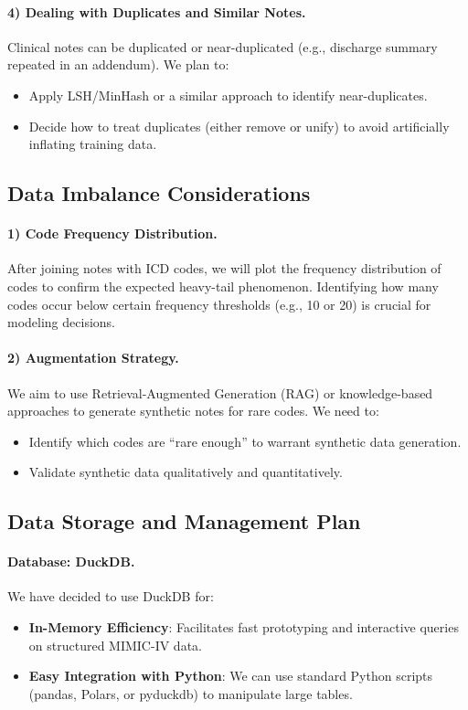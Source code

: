 \paragraph{4) Dealing with Duplicates and Similar Notes.}
Clinical notes can be duplicated or near-duplicated (e.g., discharge summary repeated in an addendum). We plan to:
\begin{itemize}
    \item Apply LSH/MinHash or a similar approach to identify near-duplicates.
    \item Decide how to treat duplicates (either remove or unify) to avoid artificially inflating training data.
\end{itemize}

\subsection{Data Imbalance Considerations}

\paragraph{1) Code Frequency Distribution.}
After joining notes with ICD codes, we will plot the frequency distribution of codes to confirm the expected heavy-tail phenomenon. Identifying how many codes occur below certain frequency thresholds (e.g., 10 or 20) is crucial for modeling decisions.

\paragraph{2) Augmentation Strategy.}
We aim to use Retrieval-Augmented Generation (RAG) or knowledge-based approaches to generate synthetic notes for rare codes. We need to:
\begin{itemize}
    \item Identify which codes are “rare enough” to warrant synthetic data generation.
    \item Validate synthetic data qualitatively and quantitatively.
\end{itemize}

\subsection{Data Storage and Management Plan}

\paragraph{Database: DuckDB.}
We have decided to use DuckDB for:
\begin{itemize}
    \item \textbf{In-Memory Efficiency}: Facilitates fast prototyping and interactive queries on structured MIMIC-IV data.
    \item \textbf{Easy Integration with Python}: We can use standard Python scripts (pandas, Polars, or pyduckdb) to manipulate large tables.
\end{itemize}

